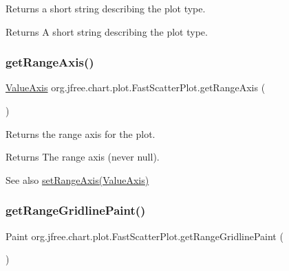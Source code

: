 Returns a short string describing the plot type.

\begin{DoxyReturn}{Returns}
A short string describing the plot type. 
\end{DoxyReturn}
\mbox{\label{classorg_1_1jfree_1_1chart_1_1plot_1_1_fast_scatter_plot_ad202f880b34e883d591b154e943177d0}} 
\subsubsection{\texorpdfstring{get\+Range\+Axis()}{getRangeAxis()}}
{\footnotesize\ttfamily \mbox{\hyperlink{classorg_1_1jfree_1_1chart_1_1axis_1_1_value_axis}{Value\+Axis}} org.\+jfree.\+chart.\+plot.\+Fast\+Scatter\+Plot.\+get\+Range\+Axis (\begin{DoxyParamCaption}{ }\end{DoxyParamCaption})}

Returns the range axis for the plot.

\begin{DoxyReturn}{Returns}
The range axis (never {\ttfamily null}).
\end{DoxyReturn}
\begin{DoxySeeAlso}{See also}
\mbox{\hyperlink{classorg_1_1jfree_1_1chart_1_1plot_1_1_fast_scatter_plot_a29f894e023c3c7b2b34baedf7db61127}{set\+Range\+Axis(\+Value\+Axis)}} 
\end{DoxySeeAlso}
\mbox{\label{classorg_1_1jfree_1_1chart_1_1plot_1_1_fast_scatter_plot_afb960031ca8207656dcbd895221a3ed1}} 
\subsubsection{\texorpdfstring{get\+Range\+Gridline\+Paint()}{getRangeGridlinePaint()}}
{\footnotesize\ttfamily Paint org.\+jfree.\+chart.\+plot.\+Fast\+Scatter\+Plot.\+get\+Range\+Gridline\+Paint (\begin{DoxyParamCaption}{ }\end{DoxyParamCaption})}

